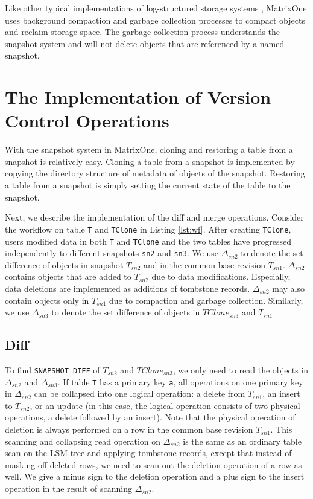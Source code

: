 \documentclass[sigconf,nonacm]{acmart} %
\begin{document}
Like other typical implementations of log-structured storage 
systems \cite{LSMTree}\cite{LSFS}, MatrixOne uses
background compaction and garbage collection processes
to compact objects and reclaim storage space.  The garbage 
collection process understands the snapshot system and will 
not delete objects that are referenced by a named snapshot.

\section{The Implementation of Version Control Operations}\label{sec:vcopimpl}
With the snapshot system in MatrixOne, cloning and restoring a table 
from a snapshot is relatively easy. 
Cloning a table from a snapshot is implemented by copying the 
directory structure of metadata of objects of the snapshot. 
Restoring a table from a snapshot is simply setting 
the current state of the table to the snapshot.

Next, we describe the implementation of the diff and merge operations.  
Consider the workflow on table \texttt{T} and \texttt{TClone} in Listing 
\ref{lst:wf}.   After creating \texttt{TClone}, users modified 
data in both \texttt{T} and \texttt{TClone} and the two tables 
have progressed independently to different snapshots 
\texttt{sn2} and \texttt{sn3}.  We use $\Delta_{sn2}$ to denote 
the set difference of objects in snapshot $T_{sn2}$ and in the 
common base revision $T_{sn1}$.  $\Delta_{sn2}$ contains objects 
that are added to $T_{sn2}$ due to data modifications. Especially, 
data deletions are implemented as additions of tombstone records. 
$\Delta_{sn2}$ may also contain objects only in $T_{sn1}$ due to 
compaction and garbage collection.  
Similarly, we use $\Delta_{sn3}$ to denote the set difference 
of objects in $TClone_{sn3}$ and $T_{sn1}$.

\subsection{Diff}\label{sec:diff}
To find \texttt{SNAPSHOT DIFF} of $T_{sn2}$ and $TClone_{sn3}$, 
we only need to read the objects in $\Delta_{sn2}$ and $\Delta_{sn3}$.  
If table \texttt{T} has a primary key \texttt{a},
all operations on one primary key in $\Delta_{sn2}$ can be collapsed 
into one logical operation: a delete from $T_{sn1}$, an insert to $T_{sn2}$, 
or an update (in this case, the logical operation consists 
of two physical operations, a delete followed by an insert).
Note that the physical operation of deletion is always performed 
on a row in the common base revision $T_{sn1}$.  
This scanning and collapsing read operation on $\Delta_{sn2}$ is the same 
as an ordinary table scan on the LSM tree and applying tombstone records,
except that instead of masking off deleted rows,  we need to scan out the 
deletion operation of a row as well.  
We give a minus sign to the deletion operation and a plus sign to 
the insert operation in the result of scanning $\Delta_{sn2}$.
\end{document}
